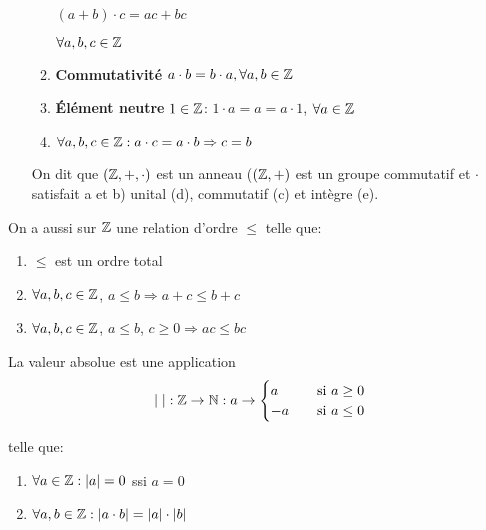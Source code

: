 \begin{enumerate}
\begin{enumerate}
\begin{minipage}{.2\textwidth}
				\hspace{0.5cm}$(a+b)\cdot c = ac + bc$\\
			\end{minipage}
			\begin{minipage}{.2\textwidth}
				\hspace{1cm}$\forall a,b,c \in \mathbb{Z}$\\
			\end{minipage}
		\item \textbf{Commutativité} $a \cdot b = b\cdot a, \forall a,b \in \mathbb{Z}$
		\item \textbf{Élément neutre} $1 \in \mathbb{Z}$: $1 \cdot a=a=a \cdot 1$, $\forall a \in \mathbb{Z}$
		\item $\forall a,b,c \in \mathbb{Z}: a\cdot c = a \cdot b \Rightarrow c=b$ \\
	\end{enumerate}
On dit que $(\mathbb{Z},+,\cdot)$ est un anneau ($(\mathbb{Z},+)$ est un groupe commutatif et $\cdot$ satisfait a et b) unital (d), commutatif (c) et intègre (e).\\
\end{enumerate}

On a aussi sur $\mathbb{Z}$ une relation d'ordre $\leq$ telle que:

\begin{enumerate}
	\item $\leq$ est un ordre total
	\item $\forall a,b,c \in \mathbb{Z}$, $a\leq b \Rightarrow a+c \leq b+c$
	\item $\forall a,b,c \in \mathbb{Z}$, $a\leq b$, $c\geq 0 \Rightarrow ac\leq bc$\\
\end{enumerate}

La valeur absolue est une application\\

\[ |\;|: \mathbb{Z} \rightarrow \mathbb{N} : a \rightarrow
  \begin{cases}
    a   & \quad \text{si } a\geq 0 \\
    -a  & \quad \text{si } a\leq 0 \\
  \end{cases}
\]

telle que: 

	\begin{enumerate}
		\item $\forall a \in \mathbb{Z}: |a| = 0$ ssi $a=0$
		\item $\forall a,b \in \mathbb{Z}: |a\cdot b| = |a| \cdot |b|$\\
	\end{enumerate}

